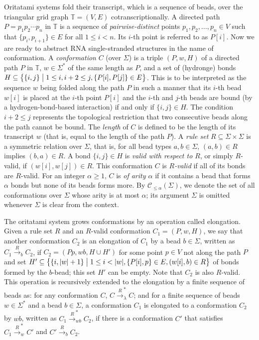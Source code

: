 \documentclass[twocolumn]{svjour3}
\begin{document}
Oritatami systems fold their transcript, which is a sequence of beads, over the triangular grid graph $\mathbb{T} = (V, E)$ cotranscriptionally. %
A directed path $P = p_1 p_2 \cdots p_n$ in $\mathbb{T}$ is a sequence of \textit{pairwise-distinct} points $p_1, p_2, \ldots, p_n \in V$ such that $\{p_i, p_{i+1}\} \in E$ for all $1 \le i < n$. 
Its $i$-th point is referred to as $P[i]$. 
Now we are ready to abstract RNA single-stranded structures in the name of conformation. 
A \textit{conformation} $C$ (over $\Sigma$) is a triple $(P, w, H)$ of a directed path $P$ in $\mathbb{T}$, $w \in \Sigma^*$ of the same length as $P$, and a set of (hydronge) bonds $H \subseteq \bigl\{\{i, j\} \bigm| 1 \le i, i+2 \le j, \{P[i], P[j]\} \in E \bigr\}$. 
This is to be interpreted as the sequence $w$ being folded along the path $P$ in such a manner that its $i$-th bead $w[i]$ is placed at the $i$-th point $P[i]$ and the $i$-th and $j$-th beads are bound (by a hydrogen-bond-based interaction) if and only if $\{i, j\} \in H$. 
The condition $i+2 \le j$ represents the topological restriction that two consecutive beads along the path cannot be bound. 
The \textit{length} of $C$ is defined to be the length of its transcript $w$ (that is, equal to the length of the path $P$). 
A \textit{rule set} $R \subseteq \Sigma \times \Sigma$ is a symmetric relation over $\Sigma$, that is, for all bead types $a, b \in \Sigma$, $(a, b) \in R$ implies $(b, a) \in R$.
A bond $\{i, j\} \in H$ is \textit{valid with respect to $R$}, or simply $R$-valid, if $(w[i], w[j]) \in R$. 
This conformation $C$ is \textit{$R$-valid} if all of its bonds are $R$-valid. %
For an integer $\alpha \ge 1$, $C$ is \textit{of arity $\alpha$} if it contains a bead that forms $\alpha$ bonds but none of its beads forms more. 
By $\mathcal{C}_{\le \alpha}(\Sigma)$, we denote the set of all conformations over $\Sigma$ whose arity is at most $\alpha$; its argument $\Sigma$ is omitted whenever $\Sigma$ is clear from the context. 

The oritatami system grows conformations by an operation called elongation. 
Given a rule set $R$ and an $R$-valid conformation $C_1 = (P, w, H)$, we say that another conformation $C_2$ is an elongation of $C_1$ by a bead $b \in \Sigma$, written as $C_1 \xrightarrow{R}_b C_2$, if $C_2 = (P p, wb, H \cup H')$ for some point $p \in V$ not along the path $P$ and set $H' \subseteq \bigl\{ \{i, |w|+1\} \bigm| 1 \le i < |w|, \{P[i], p\} \in E, (w[i], b) \in R \bigr\}$ of bonds formed by the $b$-bead; this set $H'$ can be empty. 
Note that $C_2$ is also $R$-valid. 
This operation is recursively extended to the elongation by a finite sequence of beads as: for any conformation $C$, $C \xrightarrow{R}_\lambda^* C$; and for a finite sequence of beads $w \in \Sigma^*$ and a bead $b \in \Sigma$, a conformation $C_1$ is elongated to a conformation $C_2$ by $wb$, written as $C_1 \xrightarrow{R}_{wb}^* C_2$, if there is a conformation $C'$ that satisfies $C_1 \xrightarrow{R}_w^* C'$ and $C' \xrightarrow{R}_b C_2$. 
\end{document}
